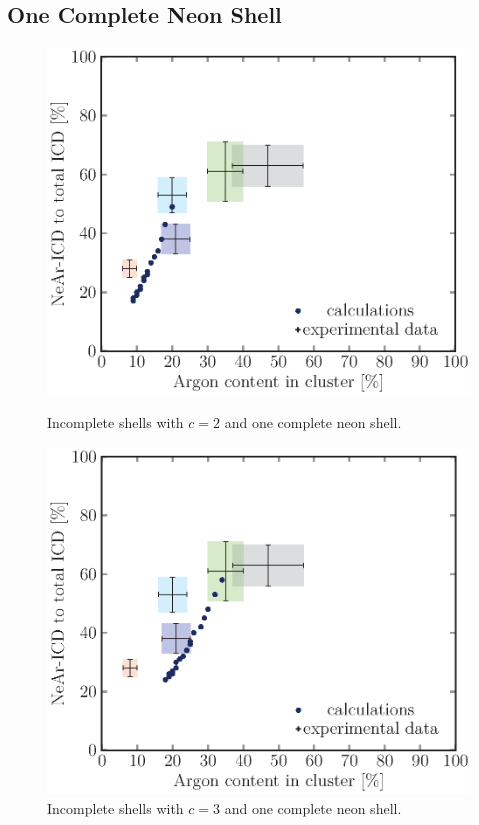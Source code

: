 \subsection{One Complete Neon Shell}
\begin{figure}[!H]
\begin{minipage}{0.48\textwidth}
    \centering
    \includegraphics[scale=0.5]{pics/incompl01_02.ps}
    \caption{Incomplete shells with $c=2$ and one complete neon shell.}
    \label{incompl01_02}
\end{minipage}
\hfill
\begin{minipage}{0.48\textwidth}
    \centering
    \includegraphics[scale=0.5]{pics/incompl01_03.ps}
    \caption{Incomplete shells with $c=3$ and one complete neon shell.}
    \label{incompl01_03}
\end{minipage}
\end{figure}

